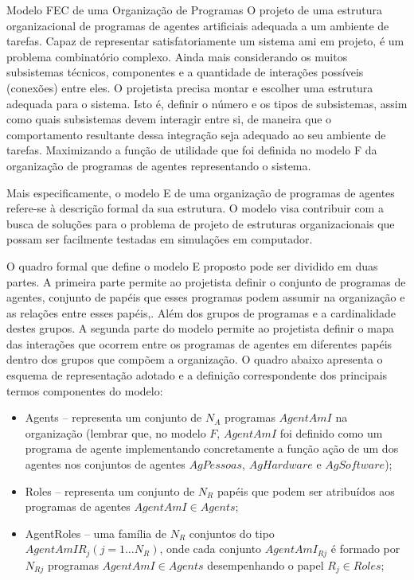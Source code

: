 \begin{section}{Modelo FEC de uma Organização de Programas}
    O projeto de uma estrutura organizacional de programas de agentes artificiais adequada a um ambiente de tarefas. Capaz de representar satisfatoriamente um sistema \acrshort{ami} em projeto, é um problema combinatório complexo. Ainda mais considerando os muitos subsistemas técnicos, componentes e a quantidade de interações possíveis (conexões) entre eles. O projetista precisa montar e escolher uma estrutura adequada para o sistema. Isto é, definir o número e os tipos de subsistemas, assim como quais subsistemas devem interagir entre si, de maneira que o comportamento resultante dessa integração seja adequado ao seu ambiente de tarefas. Maximizando a função de utilidade que foi definida no modelo F da organização de programas de agentes representando o sistema. 
    
    Mais especificamente, o modelo E de uma organização de programas de agentes refere-se à descrição formal da sua estrutura. O modelo visa contribuir com a busca de soluções para o problema de projeto de estruturas organizacionais que possam ser facilmente testadas em simulações em computador. 
    
    O quadro formal que define o modelo E proposto pode ser dividido em duas partes. A primeira parte permite ao projetista definir o conjunto de programas de agentes, conjunto de papéis que esses programas podem assumir na organização e as relações entre esses papéis,. Além dos grupos de programas e a cardinalidade destes grupos. A segunda parte do modelo permite ao projetista definir o mapa das interações que ocorrem entre os programas de agentes em diferentes papéis dentro dos grupos que compõem a organização. O quadro abaixo apresenta o esquema de representação adotado e a definição correspondente dos principais termos componentes do modelo:
    
    \begin{itemize}
    
        \item Agents -- representa um conjunto de $N_A$ programas $AgentAmI$ na organização (lembrar que, no modelo $F$, $AgentAmI$ foi definido como um programa de agente implementando concretamente a função ação de um dos agentes nos conjuntos de agentes $AgPessoas$, $AgHardware$ e $AgSoftware$);
        
        \item Roles -- representa um conjunto de $N_R$ papéis que podem ser atribuídos aos programas de agentes $AgentAmI \in Agents$;
        
        \item AgentRoles -- uma família de $N_R$ conjuntos do tipo $AgentAmIR_j (j = 1 \ldots N_R)$, onde cada conjunto $AgentAmI_{Rj}$ é formado por $N_{Rj}$ programas $AgentAmI \in Agents$ desempenhando o papel $R_j \in Roles$;
        

\end{itemize}
\end{section}
